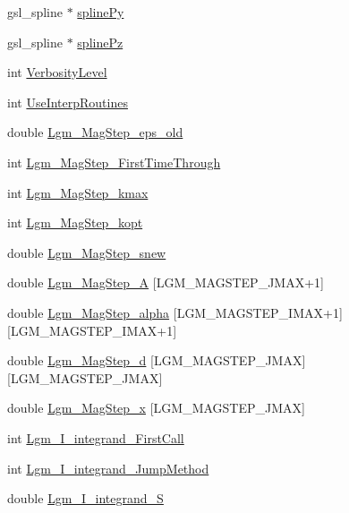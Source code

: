 \begin{CompactItemize}
\item 
gsl\_\-spline $\ast$ \hyperlink{struct_lgm___mag_model_info_1122f71b0439cefad84c3d362409af9e}{splinePy}
\item 
gsl\_\-spline $\ast$ \hyperlink{struct_lgm___mag_model_info_5463eef92d8b039ea695f0666c59c69f}{splinePz}
\item 
int \hyperlink{struct_lgm___mag_model_info_ef3011234df74566b679b46e01273bb7}{VerbosityLevel}
\item 
int \hyperlink{struct_lgm___mag_model_info_beeccfbf7295d0c631353a9159972a74}{UseInterpRoutines}
\item 
double \hyperlink{struct_lgm___mag_model_info_cbad03b970a668a0beb805a283fa01cf}{Lgm\_\-MagStep\_\-eps\_\-old}
\item 
int \hyperlink{struct_lgm___mag_model_info_fa214459195ced041bebfae2220e17c2}{Lgm\_\-MagStep\_\-FirstTimeThrough}
\item 
int \hyperlink{struct_lgm___mag_model_info_dbca9048683a6b46691f16bbc6badc91}{Lgm\_\-MagStep\_\-kmax}
\item 
int \hyperlink{struct_lgm___mag_model_info_9074ef2a6a61faf148f617fc02a8f9df}{Lgm\_\-MagStep\_\-kopt}
\item 
double \hyperlink{struct_lgm___mag_model_info_289830ee3ee42ca423ae557a9417fb90}{Lgm\_\-MagStep\_\-snew}
\item 
double \hyperlink{struct_lgm___mag_model_info_33ce6893a0952ee0bcf577a9f9f802ff}{Lgm\_\-MagStep\_\-A} \mbox{[}LGM\_\-MAGSTEP\_\-JMAX+1\mbox{]}
\item 
double \hyperlink{struct_lgm___mag_model_info_62bf5ca4d843811f15f1592223b72c79}{Lgm\_\-MagStep\_\-alpha} \mbox{[}LGM\_\-MAGSTEP\_\-IMAX+1\mbox{]}\mbox{[}LGM\_\-MAGSTEP\_\-IMAX+1\mbox{]}
\item 
double \hyperlink{struct_lgm___mag_model_info_7e69c8ba64e1329002344adc94aa6594}{Lgm\_\-MagStep\_\-d} \mbox{[}LGM\_\-MAGSTEP\_\-JMAX\mbox{]}\mbox{[}LGM\_\-MAGSTEP\_\-JMAX\mbox{]}
\item 
double \hyperlink{struct_lgm___mag_model_info_d2c62978bb8693b682121af1a5e57779}{Lgm\_\-MagStep\_\-x} \mbox{[}LGM\_\-MAGSTEP\_\-JMAX\mbox{]}
\item 
int \hyperlink{struct_lgm___mag_model_info_702cb79ba0ac9c88d1038676a4db833f}{Lgm\_\-I\_\-integrand\_\-FirstCall}
\item 
int \hyperlink{struct_lgm___mag_model_info_c3c19bdf192ad5db270e70441bfa3392}{Lgm\_\-I\_\-integrand\_\-JumpMethod}
\item 
double \hyperlink{struct_lgm___mag_model_info_bd9305e3ff7eac184a3f651ae47ae5bc}{Lgm\_\-I\_\-integrand\_\-S}

\end{CompactItemize}
